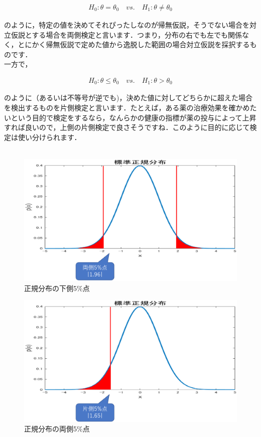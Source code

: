 \documentclass[11pt,a4paper]{ujreport} 	%
\begin{document}
\begin{align}
  H_0:\theta = \theta_0\quad vs. \quad H_1:\theta \neq \theta_0
\end{align}

のように，特定の値を決めてそれぴったしなのが帰無仮説，そうでない場合を対立仮説とする場合を両側検定と言います．つまり，分布の右でも左でも関係なく，とにかく帰無仮説で定めた値から逸脱した範囲の場合対立仮説を採択するものです．\\

一方で，

\begin{align}
  H_0:\theta \leq \theta_0 \quad vs. \quad H_1 : \theta > \theta_0
\end{align}

のように（あるいは不等号が逆でも)，決めた値に対してどちらかに超えた場合を検出するものを片側検定と言います．たとえば，ある薬の治療効果を確かめたいという目的で検定をするなら，なんらかの健康の指標が薬の投与によって上昇すれば良いので，上側の片側検定で良さそうですね．このように目的に応じて検定は使い分けられます．\\\\

\begin{figure}[H]
    \centering
    \includegraphics[width=120mm]{../figures/oneside-t.eps}
    \caption{正規分布の下側5\%点}
  \end{figure}
  
  \begin{figure}[H]
    \centering
    \includegraphics[width=120mm]{../figures/twoside-t.eps}
    \caption{正規分布の両側5\%点}
  \end{figure}
\end{document}
